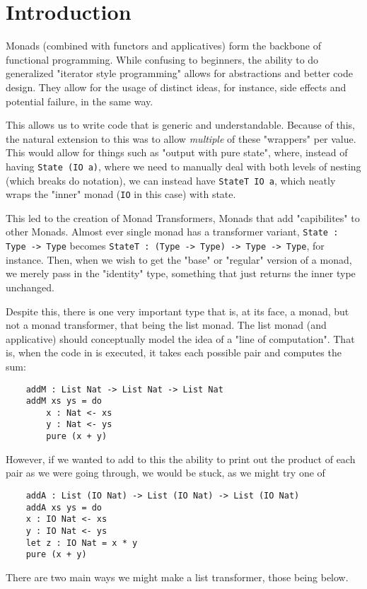 \section{Introduction} 

Monads (combined with functors and applicatives) form the backbone of functional programming.
While confusing to beginners, the ability to do generalized "iterator style programming" allows for abstractions and better code design. \cite{monads}
They allow for the usage of distinct ideas, for instance, side effects and potential failure, in the same way.

This allows us to write code that is generic and understandable.
Because of this, the natural extension to this was to allow \emph{multiple} of these "wrappers" per value.
This would allow for things such as "output with pure state", where, instead of having \verb|State (IO a)|, where we need to manually deal with both levels of nesting (which breaks do notation), we can instead have \verb|StateT IO a|, which neatly wraps the "inner" monad (\verb|IO| in this case) with state.

This led to the creation of Monad Transformers, Monads that add "capibilites" to other Monads.
Almost ever single monad has a transformer variant, \verb|State : Type -> Type| becomes \verb|StateT : (Type -> Type) -> Type -> Type|, for instance.
Then, when we wish to get the "base" or "regular" version of a monad, we merely pass in the "identity" type, something that just returns the inner type unchanged.

Despite this, there is one very important type that is, at its face, a monad, but not a monad transformer, that being the list monad.
The list monad (and applicative) should conceptually model the idea of a "line of computation".
That is, when the code in  is executed, it takes each possible pair and computes the sum:

\begin{verbatim}
	addM : List Nat -> List Nat -> List Nat
	addM xs ys = do 
		x : Nat <- xs
		y : Nat <- ys 
		pure (x + y)
\end{verbatim}

However, if we wanted to add to this the ability to print out the product of each pair as we were going through, we would be stuck, as we might try one of  

\begin{verbatim}
	addA : List (IO Nat) -> List (IO Nat) -> List (IO Nat)
	addA xs ys = do 
	x : IO Nat <- xs
	y : IO Nat <- ys 
	let z : IO Nat = x * y
	pure (x + y)
\end{verbatim}

There are two main ways we might make a list transformer, those being below.
